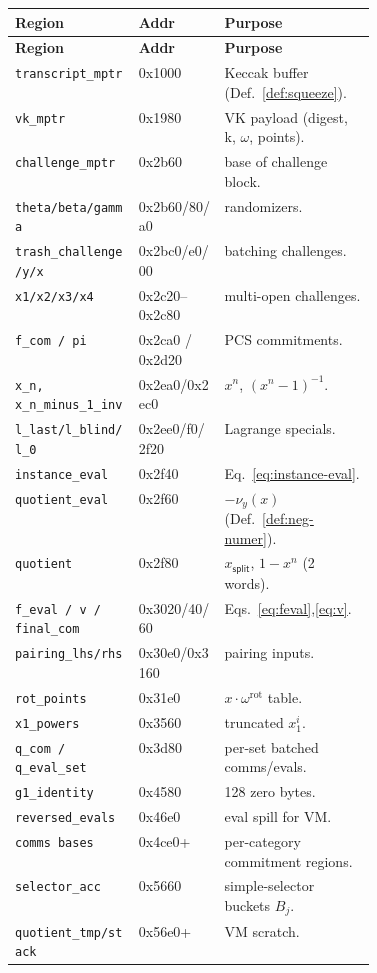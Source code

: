 \begin{longtable}{@{}llp{0.42\linewidth}@{}}
\toprule
\textbf{Region} & \textbf{Addr} & \textbf{Purpose} \\
\midrule
\endfirsthead
\toprule
\textbf{Region} & \textbf{Addr} & \textbf{Purpose} \\
\midrule
\endhead
\texttt{transcript\_mptr} & 0x1000 & Keccak buffer (Def.~\ref{def:squeeze}). \\
\texttt{vk\_mptr} & 0x1980 & VK payload (digest, k, $\omega$, points). \\
\texttt{challenge\_mptr} & 0x2b60 & base of challenge block. \\
\texttt{theta/beta/gamma} & 0x2b60/80/a0 & randomizers. \\
\texttt{trash\_\allowbreak{}challenge/\allowbreak{}y/\allowbreak{}x} & 0x2bc0/e0/00 & batching challenges. \\
\texttt{x1/x2/x3/x4} & 0x2c20--0x2c80 & multi-open challenges. \\
\texttt{f\_com / pi} & 0x2ca0 / 0x2d20 & PCS commitments. \\
\texttt{x\_\allowbreak{}n, x\_\allowbreak{}n\_\allowbreak{}minus\_\allowbreak{}1\_\allowbreak{}inv} & 0x2ea0/0x2ec0 & $x^n$, $(x^n-1)^{-1}$. \\
\texttt{l\_\allowbreak{}last/\allowbreak{}l\_\allowbreak{}blind/\allowbreak{}l\_\allowbreak{}0} & 0x2ee0/f0/2f20 & Lagrange specials. \\
\texttt{instance\_eval} & 0x2f40 & Eq.~\eqref{eq:instance-eval}. \\
\texttt{quotient\_eval} & 0x2f60 & $-\nu_y(x)$ (Def.~\ref{def:neg-numer}). \\
\texttt{quotient} & 0x2f80 & $x_{\mathsf{split}}$, $1-x^n$ (2 words). \\
\texttt{f\_\allowbreak{}eval /\allowbreak{} v /\allowbreak{} final\_\allowbreak{}com} & 0x3020/40/60 & Eqs.~\eqref{eq:feval},\eqref{eq:v}. \\
\texttt{pairing\_lhs/rhs} & 0x30e0/0x3160 & pairing inputs. \\
\texttt{rot\_points} & 0x31e0 & $x\cdot\omega^{\text{rot}}$ table. \\
\texttt{x1\_powers} & 0x3560 & truncated $x_1^i$. \\
\texttt{q\_\allowbreak{}com /\allowbreak{} q\_\allowbreak{}eval\_\allowbreak{}set} & 0x3d80 & per-set batched comms/evals. \\
\texttt{g1\_identity} & 0x4580 & 128 zero bytes. \\
\texttt{reversed\_evals} & 0x46e0 & eval spill for VM. \\
\texttt{comms bases} & 0x4ce0+ & per-category commitment regions. \\
\texttt{selector\_acc} & 0x5660 & simple-selector buckets $B_j$. \\
\texttt{quotient\_\allowbreak{}tmp/\allowbreak{}stack} & 0x56e0+ & VM scratch. \\
\bottomrule
\end{longtable}

